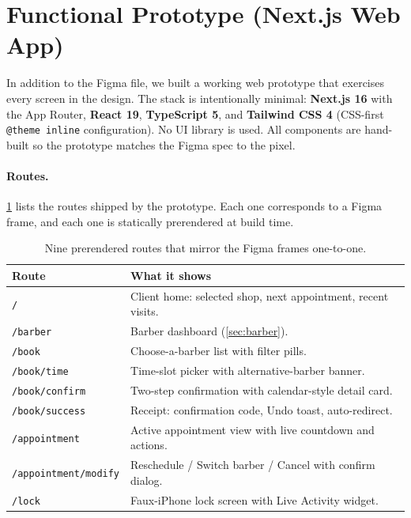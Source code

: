 \documentclass[12pt,a4paper]{article}
\begin{document}
\section{Functional Prototype (Next.js Web App)}
\label{sec:prototype}

In addition to the Figma file, we built a working web prototype that
exercises every screen in the design. The stack is intentionally
minimal: \textbf{Next.js 16} with the App Router, \textbf{React 19},
\textbf{TypeScript 5}, and \textbf{Tailwind CSS 4} (CSS-first
\texttt{@theme inline} configuration). No UI library is used. All
components are hand-built so the prototype matches the Figma spec to
the pixel.

\paragraph{Routes.}
\cref{tab:routes} lists the routes shipped by the prototype. Each
one corresponds to a Figma frame, and each one is statically
prerendered at build time.

\begin{table}[H]
\centering\small
\begin{tabular}{@{}lp{10.5cm}@{}}
\toprule
\textbf{Route} & \textbf{What it shows}\\
\midrule
\texttt{/}                   & Client home: selected shop, next appointment, recent visits.\\
\texttt{/barber}             & Barber dashboard (\cref{sec:barber}).\\
\texttt{/book}               & Choose-a-barber list with filter pills.\\
\texttt{/book/time}          & Time-slot picker with alternative-barber banner.\\
\texttt{/book/confirm}       & Two-step confirmation with calendar-style detail card.\\
\texttt{/book/success}       & Receipt: confirmation code, Undo toast, auto-redirect.\\
\texttt{/appointment}        & Active appointment view with live countdown and actions.\\
\texttt{/appointment/modify} & Reschedule / Switch barber / Cancel with confirm dialog.\\
\texttt{/lock}               & Faux-iPhone lock screen with Live Activity widget.\\
\bottomrule
\end{tabular}
\caption{Nine prerendered routes that mirror the Figma frames
one-to-one.}
\label{tab:routes}
\end{table}
\end{document}
